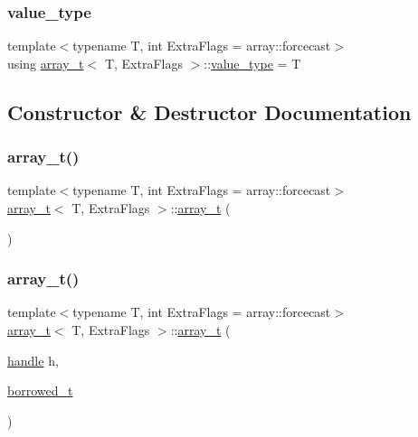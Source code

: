 \subsubsection{\texorpdfstring{value\_type}{value\_type}}
{\footnotesize\ttfamily template$<$typename T, int Extra\+Flags = array\+::forcecast$>$ \\
using \mbox{\hyperlink{classarray__t}{array\+\_\+t}}$<$ T, Extra\+Flags $>$\+::\mbox{\hyperlink{classarray__t_a8d5309087f29c7ad8a9187ec9756a6c2}{value\+\_\+type}} =  T}



\subsection{Constructor \& Destructor Documentation}
\mbox{\label{classarray__t_a8f6c17079f3e88320d6a8461c81d6542}} 
\subsubsection{\texorpdfstring{array\_t()}{array\_t()}\hspace{0.1cm}{\footnotesize\ttfamily [1/9]}}
{\footnotesize\ttfamily template$<$typename T, int Extra\+Flags = array\+::forcecast$>$ \\
\mbox{\hyperlink{classarray__t}{array\+\_\+t}}$<$ T, Extra\+Flags $>$\+::\mbox{\hyperlink{classarray__t}{array\+\_\+t}} (\begin{DoxyParamCaption}{ }\end{DoxyParamCaption})\hspace{0.3cm}{\ttfamily [inline]}}

\mbox{\label{classarray__t_a1572688dd276c040ecf7cf95bf71f99d}} 
\subsubsection{\texorpdfstring{array\_t()}{array\_t()}\hspace{0.1cm}{\footnotesize\ttfamily [2/9]}}
{\footnotesize\ttfamily template$<$typename T, int Extra\+Flags = array\+::forcecast$>$ \\
\mbox{\hyperlink{classarray__t}{array\+\_\+t}}$<$ T, Extra\+Flags $>$\+::\mbox{\hyperlink{classarray__t}{array\+\_\+t}} (\begin{DoxyParamCaption}\item[{\mbox{\hyperlink{classhandle}{handle}}}]{h,  }\item[{\mbox{\hyperlink{structobject_1_1borrowed__t}{borrowed\+\_\+t}}}]{ }\end{DoxyParamCaption})\hspace{0.3cm}{\ttfamily [inline]}}

